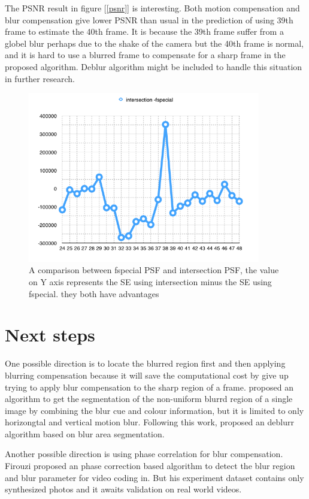\documentclass{article}
\begin{document}
The PSNR result in figure [\ref{psnr}] is interesting. Both motion compensation and blur compensation give lower PSNR than usual in the prediction of using 39th frame to estimate the 40th frame. It is because the 39th frame suffer from a globel blur perhaps due to the shake of the camera but the 40th frame is normal, and it is hard to use a blurred frame to compensate for a sharp frame in the proposed algorithm. Deblur algorithm might be included to handle this situation in further research.



\begin{figure}
   \centering
   \includegraphics[width=4in]{compare-fspe-interse.png} 
   \caption{A comparison between fspecial PSF and intersection PSF, the value on Y axis represents the SE using intersection minus the SE using fspecial. they both have advantages}
   \label{compare}
\end{figure}
\section{Next steps}

One possible direction is to locate the blurred region first and then applying blurring compensation because it will save the computational cost by give up trying to apply blur compensation to the sharp region of a frame. \cite{Chakrabarti:cb} proposed an algorithm to get the segmentation of the non-uniform blurrd region of a single image by combining the blur cue and colour information, but it is limited to only horizongtal and vertical motion blur. Following this work, \cite{CouzinieDevy:2013bf} proposed an deblurr algorithm based on blur area segmentation.


Another possible direction is using phase correlation for blur compensation. Firouzi proposed an phase correction based algorithm to detect the blur region and blur parameter for video coding in\cite{Firouzi:2014tf}. But his experiment dataset contains only synthesized photos and it awaits validation on real world videos.
\end{document}
